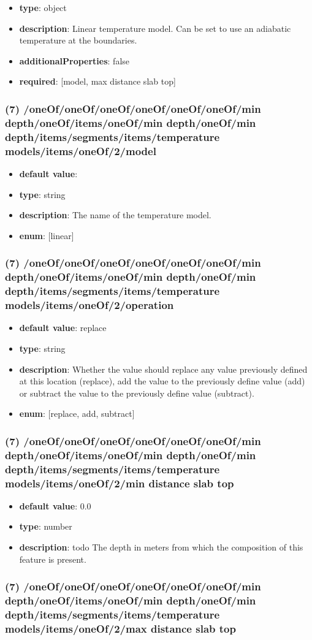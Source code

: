 \begin{itemize}[leftmargin=6em]\item {\bf type}: object
\item {\bf description}: Linear temperature model. Can be set to use an adiabatic temperature at the boundaries.
\item {\bf additionalProperties}: false
\item {\bf required}: [model, max distance slab top]\end{itemize}
\subsubsection{(7) /oneOf/oneOf/oneOf/oneOf/oneOf/oneOf/min depth/oneOf/items/oneOf/min depth/oneOf/min depth/items/segments/items/temperature models/items/oneOf/2/model}
\begin{itemize}[leftmargin=7em]\item {\bf default value}: 
\item {\bf type}: string
\item {\bf description}: The name of the temperature model.
\item {\bf enum}: [linear]\end{itemize}\subsubsection{(7) /oneOf/oneOf/oneOf/oneOf/oneOf/oneOf/min depth/oneOf/items/oneOf/min depth/oneOf/min depth/items/segments/items/temperature models/items/oneOf/2/operation}
\begin{itemize}[leftmargin=7em]\item {\bf default value}: replace
\item {\bf type}: string
\item {\bf description}: Whether the value should replace any value previously defined at this location (replace), add the value to the previously define value (add) or subtract the value to the previously define value (subtract).
\item {\bf enum}: [replace, add, subtract]\end{itemize}\subsubsection{(7) /oneOf/oneOf/oneOf/oneOf/oneOf/oneOf/min depth/oneOf/items/oneOf/min depth/oneOf/min depth/items/segments/items/temperature models/items/oneOf/2/min distance slab top}
\begin{itemize}[leftmargin=7em]\item {\bf default value}: 0.0
\item {\bf type}: number
\item {\bf description}: todo The depth in meters from which the composition of this feature is present.
\end{itemize}\subsubsection{(7) /oneOf/oneOf/oneOf/oneOf/oneOf/oneOf/min depth/oneOf/items/oneOf/min depth/oneOf/min depth/items/segments/items/temperature models/items/oneOf/2/max distance slab top}
